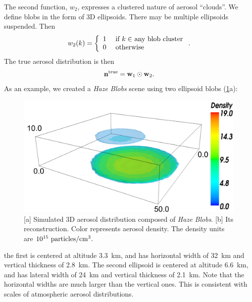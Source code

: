\documentclass[10pt,letterpaper]{article}
\newcommand{\yoavcomment}[1]{}
\renewcommand{\yoavcomment}[1]{#1} %
\begin{document}
The second function, $w_2$, expresses a clustered nature of aerosol
``clouds''. We define blobs in the form of 3D ellipsoids. There may be
multiple ellipsoids suspended.  Then
\begin{equation}
  w_2(k) =
  \left\{
    \begin{array}{ll}
      1  & \mbox{ if $k\in$ any blob cluster} \\
      0  & \mbox{ otherwise}
      \label{eq:f2}
    \end{array}
  \right.
  .
  \hspace{-0.05cm}
\end{equation}
The true aerosol distribution is then
\begin{equation}
  \label{eq:ntrue}
  {\bf n}^{\rm true}={\bf w}_1\odot {\bf w}_2  .
  \hspace{-0.05cm}
\end{equation}
As an example, we created a {\em Haze Blobs} scene using two ellipsoid
blobs (\cref{fig:simulation1}a):
\begin{figure} \centering
  \yoavcomment{\includegraphics[width=\columnwidth]{images/simulation1}}
  \caption{\small [a] Simulated 3D aerosol distribution composed of
    {\em Haze Blobs}. [b] Its reconstruction. Color represents aerosol
    density. The density units are $10^{15}~{\rm particles}/{\rm
      cm}^3.$}
  \label{fig:simulation1}
\end{figure}
the first is centered at altitude \SI{3.3}{\km}, and has horizontal
width of \SI{32}{\km} and vertical thickness of \SI{2.8}{\km}. The
second ellipsoid is centered at altitude \SI{6.6}{\km}, and has
lateral width of \SI{24}{\km} and vertical thickness of
\SI{2.1}{\km}. Note that the horizontal widths are much larger than
the vertical ones. This is consistent with scales of atmospheric
aerosol distributions.
\end{document}
